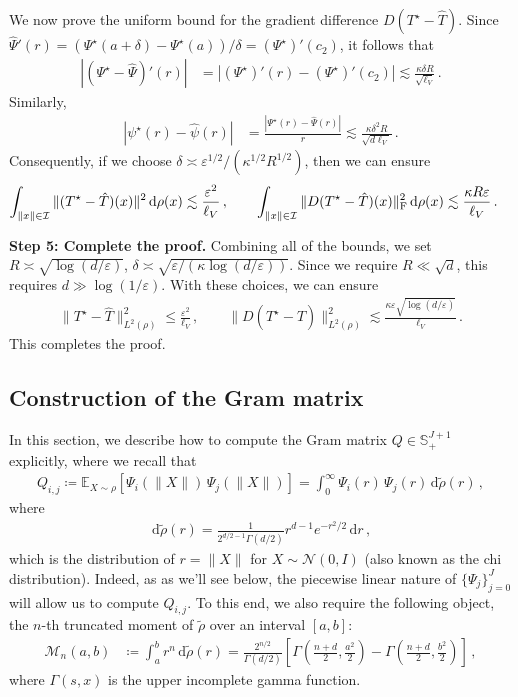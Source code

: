 \documentclass[twoside]{article}
\newcommand{\cI}{\mathcal{I}}
\newcommand{\cN}{\mathcal{N}}
\newcommand{\1}{\mathds{1}}
\newcommand{\eps}{\varepsilon}
\renewcommand{\epsilon}{\varepsilon}
\newcommand*{\E}{\mathbb E}
\newcommand*{\defeq}{\coloneqq}
\newcommand*{\rd}{\mathrm{d}}
\newcommand*{\dd}{\, \rd}
\theoremstyle{plain}
\theoremstyle{definition}
\theoremstyle{remark}
\renewcommand{\tilde}{\widetilde}
\begin{document}
We now prove the uniform bound for the gradient difference $D(T^\star - \hat T)$.
Since $\hat\Psi'(r) = (\Psi^\star(a+\delta) - \Psi^\star(a))/\delta = (\Psi^\star)'(c_2)$, it follows that
\begin{align*}
    |(\Psi^\star - \hat\Psi)'(r)|
    &= |(\Psi^\star)'(r) - (\Psi^\star)'(c_2)|
    \lesssim \frac{\kappa \delta R}{\sqrt{\ell_V}}\,.
\end{align*}
Similarly,
\begin{align*}
    |\psi^\star(r) - \hat\psi(r)|
    &= \frac{|\Psi^\star(r) - \hat\Psi(r)|}{r}
    \lesssim \frac{\kappa \delta^2 R}{\sqrt{d\ell_V}}\,.
\end{align*}
Consequently, if we choose $\delta \asymp \epsilon^{1/2}/(\kappa^{1/2} R^{1/2})$, then we can ensure
\begin{align*}
    \int_{\|x\|\in \cI} \|(T^\star - \hat T)(x)\|^2\dd\rho(x)
    &\lesssim \frac{\epsilon^2}{\ell_V}\,, \qquad  \int_{\|x\|\in \cI} \|D(T^\star - \hat T)(x)\|_{\rm F}^2\dd\rho(x) \lesssim \frac{\kappa R \epsilon}{\ell_V}\,.
\end{align*}

\textbf{Step 5: Complete the proof.}
Combining all of the bounds, we set $R \asymp \sqrt{\log(d/\epsilon)}$, $\delta \asymp \sqrt{\epsilon/(\kappa \log(d/\epsilon))}$.
Since we require $R \ll \sqrt d$, this requires $d \gg \log(1/\eps)$.
With these choices, we can ensure
\begin{align*}
    \|T^\star - \hat T\|_{L^2(\rho)}^2 \le \frac{\epsilon^2}{\ell_V}\,, \qquad \|D(T^\star - \hat T)\|_{L^2(\rho)}^2 \lesssim \frac{\kappa \epsilon \sqrt{\log(d/\epsilon)}}{\ell_V}\,.
\end{align*}
This completes the proof. 

\subsection{Construction of the Gram matrix}\label{app:gram_construction}
In this section, we describe how to compute the Gram matrix $Q \in \mathbb{S}_+^{J+1}$ explicitly, where we recall that
\begin{align*}
    Q_{i,j} \defeq \E_{X \sim \rho}[\Psi_i(\|X\|)\,\Psi_j(\|X\|)] = \int_0^\infty \Psi_i(r)\,\Psi_j(r) \dd \tilde{\rho}(r)\,,
\end{align*}
where 
\begin{align} \label{eq:chi_density}
    \dd \tilde{\rho}(r) = \frac{1}{2^{d/2-1}\Gamma(d/2)} r^{d-1} e^{-r^2/2} \dd r\,,
\end{align}
which is the distribution of $r = \|X\|$ for $X \sim \cN(0,I)$ (also known as the chi distribution). Indeed, as as we'll see below, the piecewise linear nature of $\{\Psi_j\}_{j=0}^J$ will allow us to compute $Q_{i,j}$. To this end, we also require the following object, the $n$-th truncated moment of $\tilde \rho$ over an interval $[a, b]$:
\begin{align} \label{eq:moments}
    \mathcal{M}_n(a, b) &\defeq \int_a^b r^n \dd \tilde{\rho}(r) \nonumber = \frac{2^{n/2}}{\Gamma(d/2)} \left[ \Gamma\left(\frac{n+d}{2}, \frac{a^2}{2}\right) - \Gamma\left(\frac{n+d}{2}, \frac{b^2}{2}\right) \right]\,,
\end{align}
where $\Gamma(s, x)$ is the upper incomplete gamma function.
\end{document}
